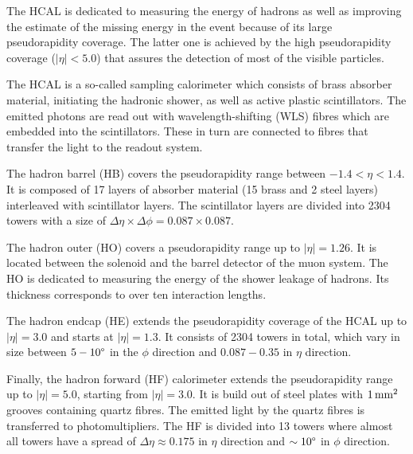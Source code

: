 The HCAL is dedicated to measuring the energy of hadrons as well as improving the estimate of the missing energy in the event because of its large pseudorapidity coverage.
The latter one is achieved by the high pseudorapidity coverage ($|\eta|<5.0$) that assures the detection of most of the visible particles.

The HCAL is a so-called sampling calorimeter which consists of brass absorber material, initiating the hadronic shower, as well as active plastic scintillators.
The emitted photons are read out with wavelength-shifting (WLS) fibres which are embedded into the scintillators.
These in turn are connected to fibres that transfer the light to the readout system.

The hadron barrel (HB) covers the pseudorapidity range between $-1.4 < \eta < 1.4$.
It is composed of 17 layers of absorber material (15 brass and 2 steel layers) interleaved with scintillator layers.
The scintillator layers are divided into 2304 towers with a size of $\Delta \eta \times \Delta \phi = 0.087 \times 0.087$.

The hadron outer (HO) covers a pseudorapidity range up to $|\eta|=1.26$.
It is located between the solenoid and the barrel detector of the muon system.
The HO is dedicated to measuring the energy of the shower leakage of hadrons.
Its thickness corresponds to over ten interaction lengths.

The hadron endcap (HE) extends the pseudorapidity coverage of the HCAL up to $|\eta|=3.0$ and starts at $|\eta|=1.3$.
It consists of 2304 towers in total, which vary in size between $5-10\degree$ in the $\phi$ direction and $0.087-0.35$ in $\eta$ direction.

Finally, the hadron forward (HF) calorimeter extends the pseudorapidity range up to $|\eta|=5.0$, starting from $|\eta|=3.0$.
It is build out of steel plates with $1\,\text{mm}^2$ grooves containing quartz fibres.
The emitted light by the quartz fibres is transferred to photomultipliers.
The HF is divided into 13 towers where almost all towers have a spread of $\Delta \eta \approx 0.175$ in $\eta$ direction and $\sim 10\degree$ in $\phi$ direction.
 
